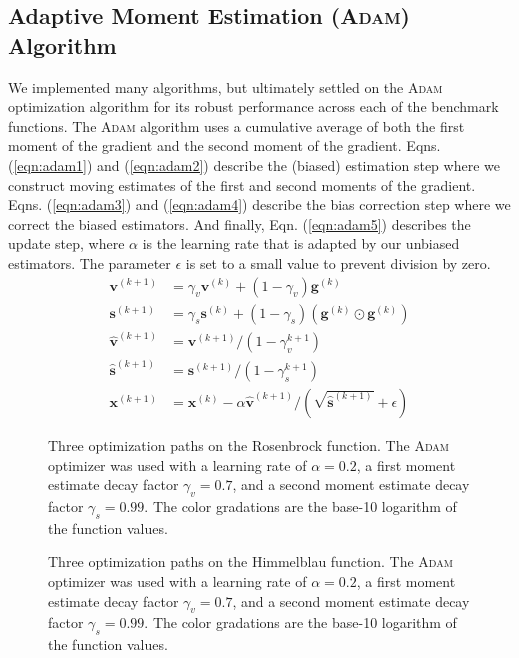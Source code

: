 \documentclass[conference]{IEEEtran}
\begin{document}
\subsection{Adaptive Moment Estimation (\textsc{Adam}) Algorithm}

We implemented many algorithms, but ultimately settled on the \textsc{Adam} optimization algorithm for its robust performance across each of the benchmark functions. The \textsc{Adam} algorithm uses a cumulative average of both the first moment of the gradient and the second moment of the gradient. Eqns. (\ref{eqn:adam1}) and (\ref{eqn:adam2}) describe the (biased) estimation step where we construct moving estimates of the first and second moments of the gradient. Eqns. (\ref{eqn:adam3}) and (\ref{eqn:adam4}) describe the bias correction step where we correct the biased estimators. And finally, Eqn. (\ref{eqn:adam5}) describes the update step, where $\alpha$ is the learning rate that is adapted by our unbiased estimators. The parameter $\epsilon$ is set to a small value to prevent division by zero.
\begin{align}
    \textbf{v}^{(k+1)} &= \gamma_v \textbf{v}^{(k)} + (1 - \gamma_v) \textbf{g}^{(k)} \label{eqn:adam1} \\
    \textbf{s}^{(k+1)} &= \gamma_s \textbf{s}^{(k)} + (1 - \gamma_s) (\textbf{g}^{(k)} \odot \textbf{g}^{(k)}) \label{eqn:adam2} \\
    \hat{\textbf{v}}^{(k+1)} &= \textbf{v}^{(k+1)}/(1 - \gamma_v^{k+1}) \label{eqn:adam3} \\
    \hat{\textbf{s}}^{(k+1)} &= \textbf{s}^{(k+1)}/(1 - \gamma_s^{k+1}) \label{eqn:adam4} \\
    \textbf{x}^{(k+1)} &= \textbf{x}^{(k)} - \alpha \hat{\textbf{v}}^{(k+1)}/ \left(\sqrt{\hat{\textbf{s}}^{(k+1)}} + \epsilon\right) \label{eqn:adam5} 
\end{align}

\begin{figure}[h]
    \centering
    
    \caption{Three optimization paths on the Rosenbrock function. The \textsc{Adam} optimizer was used with a learning rate of $\alpha = 0.2$, a first moment estimate decay factor $\gamma_v = 0.7$, and a second moment estimate decay factor $\gamma_s = 0.99$. The color gradations are the base-10 logarithm of the function values.}
    \label{fig:rosenbrock_opt}
\end{figure}
\begin{figure}[h]
    \centering
    
    \caption{Three optimization paths on the Himmelblau function. The \textsc{Adam} optimizer was used with a learning rate of $\alpha = 0.2$, a first moment estimate decay factor $\gamma_v = 0.7$, and a second moment estimate decay factor $\gamma_s = 0.99$. The color gradations are the base-10 logarithm of the function values.}
    \label{fig:himmelblau_opt}
\end{figure}
\end{document}
